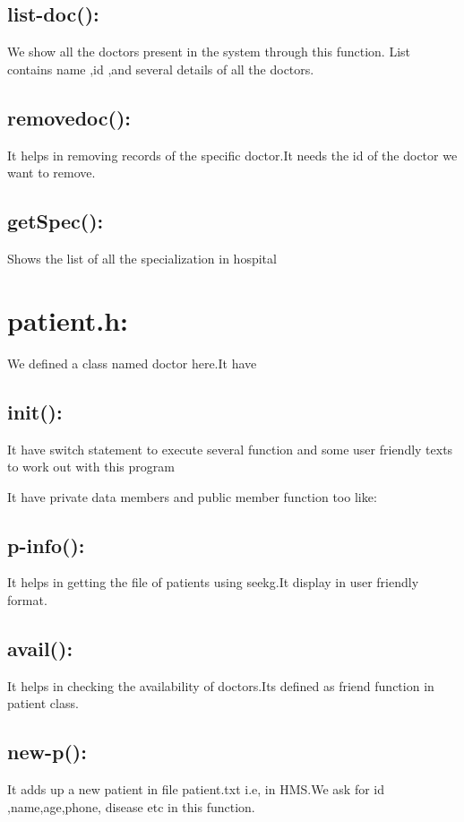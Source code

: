 \documentclass[a4paper, 14pt]{report}
\begin{document}
{\subsection{list-doc():}
We show all the doctors present in the system through this function. List contains name ,id ,and several details of all the doctors.

\subsection{removedoc():}
It helps in removing records of the specific doctor.It needs the id of the doctor we want to remove.

\subsection{getSpec():}
Shows the list of all the specialization in hospital

\section{patient.h:}
We defined a class named doctor here.It have
\subsection{init():}
It have switch statement to execute several function and some user friendly texts
 to work out with this program

It have private data members and public member function too like:

\subsection{p-info():}
It helps in getting the file of patients using seekg.It display in user friendly format. 

\subsection{avail():}
It helps in checking the availability of doctors.Its defined as friend function in patient class.

\subsection{new-p():}
It adds up a new patient in file patient.txt i.e, in HMS.We ask for id ,name,age,phone, disease etc in this function. 

}
\end{document}
